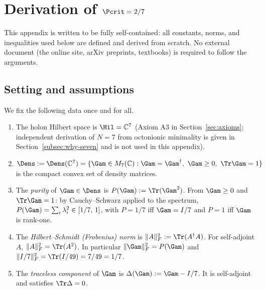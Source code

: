 
\section{Derivation of $\Pcrit = 2/7$}
\label{app:pcrit}

This appendix is written to be fully self-contained: all constants, norms, and
inequalities used below are defined and derived from scratch. No external
document (the online site, arXiv preprints, textbooks) is required to follow
the arguments.

\subsection{Setting and assumptions}
\label{app:pcrit-setting}

We fix the following data once and for all.

\begin{enumerate}[leftmargin=2em,nosep]
  \item The holon Hilbert space is $\Hil = \mathbb{C}^7$ (Axiom A3 in
    Section~\ref{sec:axioms}; independent derivation of $N=7$ from octonionic
    minimality is given in Section~\ref{subsec:why-seven} and is not used
    in this appendix).
  \item $\Dens := \Dens(\mathbb{C}^7) = \{\Gam \in M_7(\mathbb{C}) : \Gam = \Gam^{\dagger},\ \Gam \geq 0,\ \Tr\Gam = 1\}$
    is the compact convex set of density matrices.
  \item The \emph{purity} of $\Gam \in \Dens$ is $P(\Gam) := \Tr(\Gam^2)$.
    From $\Gam \geq 0$ and $\Tr\Gam = 1$: by Cauchy--Schwarz applied to the
    spectrum,
    $P(\Gam) = \sum_i \lambda_i^2 \in [1/7,\,1]$,
    with $P = 1/7$ iff $\Gam = I/7$ and $P = 1$ iff $\Gam$ is rank-one.
  \item The \emph{Hilbert--Schmidt (Frobenius) norm} is
    $\|A\|_F^2 := \Tr(A^{\dagger}A)$. For self-adjoint $A$,
    $\|A\|_F^2 = \Tr(A^2)$. In particular $\|\Gam\|_F^2 = P(\Gam)$ and
    $\|I/7\|_F^2 = \Tr(I/49) = 7/49 = 1/7$.
  \item The \emph{traceless component} of $\Gam$ is $\Delta(\Gam) := \Gam - I/7$.
    It is self-adjoint and satisfies $\Tr\Delta = 0$.
\end{enumerate}

